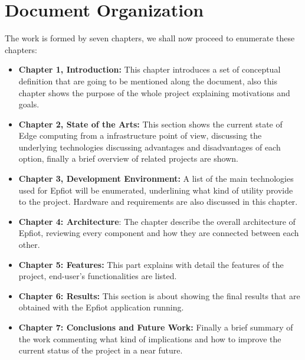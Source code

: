 \newpage
\section{Document Organization}
\label{makereference1.3}

The work is formed by seven chapters, we shall now proceed to enumerate these chapters:

\begin{itemize}
  \item \textbf{Chapter 1, Introduction:} This chapter introduces a set of conceptual definition that are going to be mentioned along the document, also this chapter shows the purpose of the whole project explaining motivations and goals.
  \item \textbf{Chapter 2, State of the Arts:} This section shows the current state of Edge computing from a infrastructure point of view, discussing the underlying technologies discussing advantages and disadvantages of each option, finally a brief overview of related projects are shown.    
  \item \textbf{Chapter 3, Development Environment:} A list of the main technologies used for Epfiot will be enumerated, underlining what kind of utility provide to the project. Hardware and requirements are also discussed in this chapter.
  \item \textbf{Chapter 4: Architecture}: The chapter describe the overall architecture of Epfiot, reviewing every component and how they are connected between each other. 
  \item \textbf{Chapter 5: Features:} This part explains with detail the features of the project, end-user's functionalities are listed.   
  \item \textbf{Chapter 6: Results:} This section is about showing the final results that are obtained with the Epfiot application running. 
  \item \textbf{Chapter 7: Conclusions and Future Work:} Finally a brief summary of the work commenting what kind of implications and how to improve the current status of the project in a near future. 
\end{itemize}

